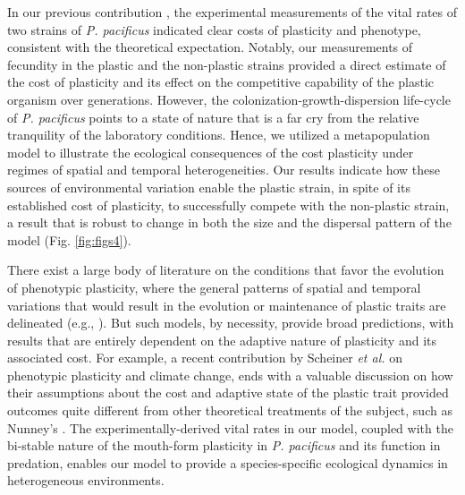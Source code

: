 \documentclass[10pt,letterpaper]{article}
\newcommand{\ppac}{\emph{P. pacificus}}
\begin{document}
\hspace{5cm}

In our previous contribution \cite{Dardiry2023}, the experimental measurements of the vital rates of two strains of \ppac{} indicated clear costs of plasticity and phenotype, consistent with the theoretical expectation. Notably, our measurements of fecundity in the plastic and the non-plastic strains provided a direct estimate of the cost of plasticity and its effect on the competitive capability of the plastic organism over generations. However, the colonization-growth-dispersion life-cycle of \ppac{} points to a state of nature that is a far cry from the relative tranquility of the laboratory conditions. Hence, we utilized a metapopulation model to illustrate the ecological consequences of the cost plasticity under regimes of spatial and temporal heterogeneities. Our results indicate how these sources of environmental variation enable the plastic strain, in spite of its established cost of plasticity, to successfully compete with the non-plastic strain, a result that is robust to change in both the size and the dispersal pattern of the model (Fig. \ref{fig:figs4}).

\hspace{5cm}

There exist a large body of literature on the conditions that favor the evolution of phenotypic plasticity, where the general patterns of spatial and temporal variations that would result in the evolution or maintenance of plastic traits are delineated (e.g., \cite{Scheiner1993aa, Tufto2000aa, Sultan2002aa, Scheiner2020aa}). But such models, by necessity, provide broad predictions, with results that are entirely dependent on the adaptive nature of plasticity and its associated cost. For example, a recent contribution by Scheiner \emph{et al.} \cite{Scheiner2020aa} on phenotypic plasticity and climate change, ends with a valuable discussion on how their assumptions about the cost and adaptive state of the plastic trait provided outcomes quite different from other theoretical treatments of the subject, such as Nunney's \cite{Nunney2015}. The experimentally-derived vital rates in our model, coupled with the bi-stable nature of the mouth-form plasticity in \ppac{} and its function in predation, enables our model to provide a species-specific ecological dynamics in heterogeneous environments.

\hspace{5cm}
\end{document}
